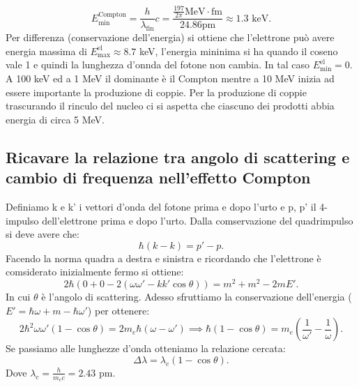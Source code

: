 \[
E^{\text{Compton}}_{\text{min}}= \frac{h}{\lambda_{\text{fin}}}c = \frac{\frac{197}{2\pi}\text{MeV}\cdot\text{fm}}{24.86 \text{pm}} \approx 1.3 \text{ keV}
.\] 
Per differenza (conservazione dell'energia) si ottiene che l'elettrone può avere energia massima di $E^{\text{el}}_{\text{max}} \approx 8.7$ keV, l'energia mininima si ha quando il coseno vale 1 e quindi la lunghezza d'onnda del fotone non cambia. In tal caso $E^{\text{el}}_{\text{min}}=0$.\\
A 100 keV ed a 1 MeV il dominante è il Compton mentre a 10 MeV inizia ad essere importante la produzione di coppie.
Per la produzione di coppie trascurando il rinculo del nucleo ci si aspetta che ciascuno dei prodotti abbia energia di circa 5 MeV.

\subsection[\hspace{1mm} Ricavare la lunghezza d'onda Compton]{Ricavare la relazione tra angolo di scattering e cambio di frequenza nell'effetto Compton
}
\label{sec:4.b.22}
Definiamo k e k' i vettori d'onda del fotone prima e dopo l'urto e p, p' il 4-impulso dell'elettrone prima e dopo l'urto. Dalla comservazione del quadrimpulso si deve avere che:
\[
	\hbar\left( k- k \right)= p'-p	
.\] 
Facendo la norma quadra a destra e sinistra e ricordando che l'elettrone è comsiderato inizialmente fermo si ottiene:
\[
	2\hbar\left( 0 + 0 - 2\left( \omega\omega'- kk'\cos\theta\right) \right) = m^2+m^2- 2mE'
.\] 
In cui $\theta$ è l'angolo di scattering. Adesso sfruttiamo la conservazione dell'energia ($E' = \hbar\omega + m - \hbar\omega'$) per ottenere:
\[
	2\hbar^2\omega\omega'\left( 1-\cos\theta \right) = 2m_{e}\hbar\left( \omega-\omega' \right) \implies 
	\hbar \left( 1-\cos\theta \right) = m_{e}\left( \frac{1}{\omega'}-\frac{1}{\omega} \right) 
.\] 
Se passiamo alle lunghezze d'onda otteniamo la relazione cercata:
\[
	\Delta \lambda = \lambda_{c}\left( 1-\cos\theta \right) 
.\] 
Dove $\lambda_{c}= \frac{h}{m_{e}c} = 2.43$ pm.

